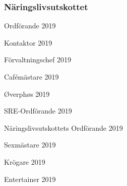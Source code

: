 \documentclass[../_main/handlingar.tex]{subfiles}
\begin{document}
\subsubsection*{Näringslivsutskottet}


\newpage
\begin{signatures}{10}
    \mvh
    \signature{\ordf}{Ordförande 2019}
    \signature{\sekr}{Kontaktor 2019}
    \signature{\fvc}{Förvaltningschef 2019}
    \signature{\cafem}{Cafémästare 2019}
    \signature{\oph}{Øverphøs 2019}
    \signature{\sreordf}{SRE-Ordförande 2019}
    \signature{\enuordf}{Näringslivsutskottets Ordförande 2019}
    \signature{\sexm}{Sexmästare 2019}
    \signature{\krog}{Krögare 2019}
    \signature{\ent}{Entertainer 2019}
\end{signatures}
\end{document}
